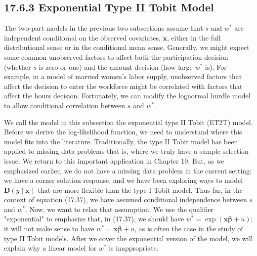 \documentclass[10pt]{article}
\begin{document}
\subsection*{17.6.3 Exponential Type II Tobit Model}
The two-part models in the previous two subsections assume that $s$ and $w^{*}$ are independent conditional on the observed covariates, $\mathbf{x}$, either in the full distributional sense or in the conditional mean sense. Generally, we might expect some common unobserved factors to affect both the participation decision (whether $s$ is zero or one) and the amount decision (how large $w^{*}$ is). For example, in a model of married women's labor supply, unobserved factors that affect the decision to enter the workforce might be correlated with factors that affect the hours decision. Fortunately, we can modify the lognormal hurdle model to allow conditional correlation between $s$ and $w^{*}$.

We call the model in this subsection the exponential type II Tobit (ET2T) model. Before we derive the log-likelihood function, we need to understand where this model fits into the literature. Traditionally, the type II Tobit model has been applied to missing data problems-that is, where we truly have a sample selection issue. We return to this important application in Chapter 19. But, as we emphasized earlier, we do not have a missing data problem in the current setting: we have a corner solution response, and we have been exploring ways to model $\mathbf{D}(y \mid \mathbf{x})$ that are more flexible than the type I Tobit model. Thus far, in the context of equation (17.37), we have assumed conditional independence between $s$ and $w^{*}$. Now, we want to relax that assumption. We use the qualifier "exponential" to emphasize that, in (17.37), we should have $w^{*}=\exp (\mathbf{x} \boldsymbol{\beta}+u)$; it will not make sense to have $w^{*}=\mathbf{x} \boldsymbol{\beta}+u$, as is often the case in the study of type II Tobit models. After we cover the exponential version of the model, we will explain why a linear model for $w^{*}$ is inappropriate.
\end{document}

